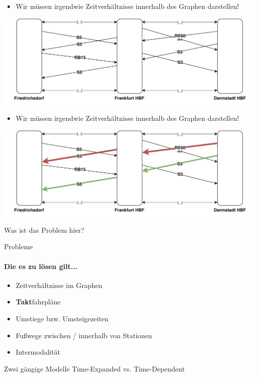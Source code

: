 \begin{frame}
	\begin{itemize}
		\item Wir müssen irgendwie Zeitverhältnisse innerhalb des Graphen darstellen!
	\end{itemize}
	
	\begin{center}
		\includegraphics[width=\linewidth]{images/simple-approach-timed.pdf}
	\end{center}
\end{frame}

\begin{frame}
	\begin{itemize}
		\item Wir müssen irgendwie Zeitverhältnisse innerhalb des Graphen darstellen!
	\end{itemize}
	
	\begin{center}
		\includegraphics[width=\linewidth]{images/simple-approach-timed-2.pdf} \pause
	\end{center}

	\begin{block}{}
		Was ist das Problem hier?
	\end{block}
\end{frame}

\begin{frame}{Probleme}
	\framesubtitle{Die es zu lösen gilt...}
	\begin{itemize}
		\item Zeitverhältnisse im Graphen \pause
		\item \textbf{Takt}fahrpläne \pause
		\item Umstiege bzw. Umsteigezeiten \pause		
		\item Fußwege zwischen / innerhalb von Stationen \pause
		\item Intermodalität
	\end{itemize}
	
	\vspace{3em}
	\begin{block}{Zwei gängige Modelle}
		Time-Expanded vs. Time-Dependent
	\end{block}
\end{frame}


